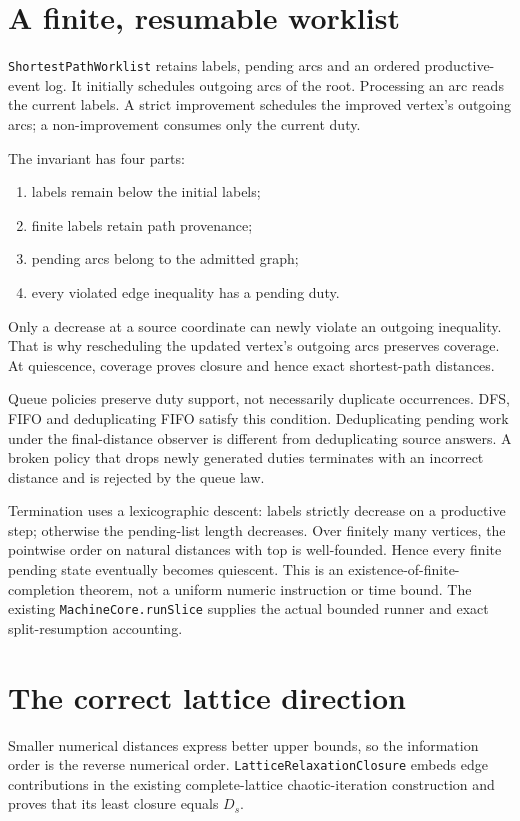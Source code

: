 \documentclass[11pt,a4paper]{article}
\newcommand{\code}[1]{\nolinkurl{#1}}
\begin{document}
\section{A finite, resumable worklist}

\code{ShortestPathWorklist} retains labels, pending arcs and an ordered
productive-event log. It initially schedules outgoing arcs of the root.
Processing an arc reads the current labels. A strict improvement schedules
the improved vertex's outgoing arcs; a non-improvement consumes only the
current duty.

The invariant has four parts:
\begin{enumerate}
\item labels remain below the initial labels;
\item finite labels retain path provenance;
\item pending arcs belong to the admitted graph;
\item every violated edge inequality has a pending duty.
\end{enumerate}
Only a decrease at a source coordinate can newly violate an outgoing
inequality. That is why rescheduling the updated vertex's outgoing arcs
preserves coverage. At quiescence, coverage proves closure and hence exact
shortest-path distances.

Queue policies preserve duty support, not necessarily duplicate occurrences.
DFS, FIFO and deduplicating FIFO satisfy this condition. Deduplicating pending
work under the final-distance observer is different from deduplicating source
answers. A broken policy that drops newly generated duties terminates with
an incorrect distance and is rejected by the queue law.

Termination uses a lexicographic descent: labels strictly decrease on a
productive step; otherwise the pending-list length decreases. Over finitely
many vertices, the pointwise order on natural distances with top is
well-founded. Hence every finite pending state eventually becomes quiescent.
This is an existence-of-finite-completion theorem, not a uniform numeric
instruction or time bound. The existing \code{MachineCore.runSlice} supplies
the actual bounded runner and exact split-resumption accounting.

\section{The correct lattice direction}

Smaller numerical distances express better upper bounds, so the information
order is the reverse numerical order. \code{LatticeRelaxationClosure}
embeds edge contributions in the existing complete-lattice chaotic-iteration
construction and proves that its least closure equals $D_s$.
\end{document}
